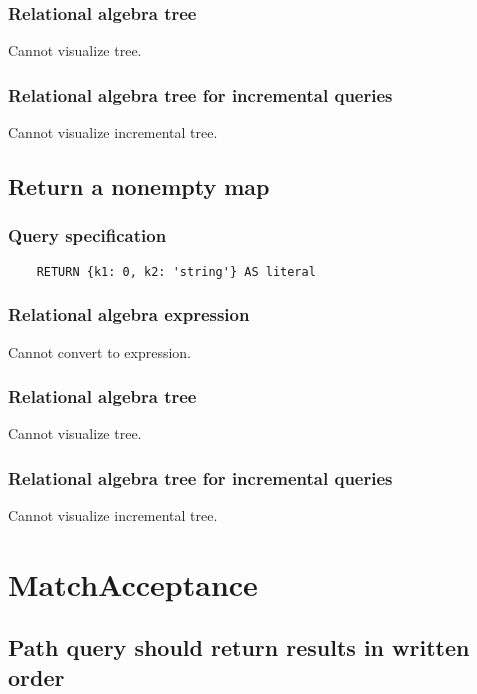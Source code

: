 	\subsubsection*{Relational algebra tree}

	Cannot visualize tree.

	\subsubsection*{Relational algebra tree for incremental queries}

	Cannot visualize incremental tree.
	\subsection{Return a nonempty map}

	\subsubsection*{Query specification}

	\begin{lstlisting}
	RETURN {k1: 0, k2: 'string'} AS literal
	\end{lstlisting}


	\subsubsection*{Relational algebra expression}

	Cannot convert to expression.

	\subsubsection*{Relational algebra tree}

	Cannot visualize tree.

	\subsubsection*{Relational algebra tree for incremental queries}

	Cannot visualize incremental tree.

	\section{MatchAcceptance}

	\subsection{Path query should return results in written order}

